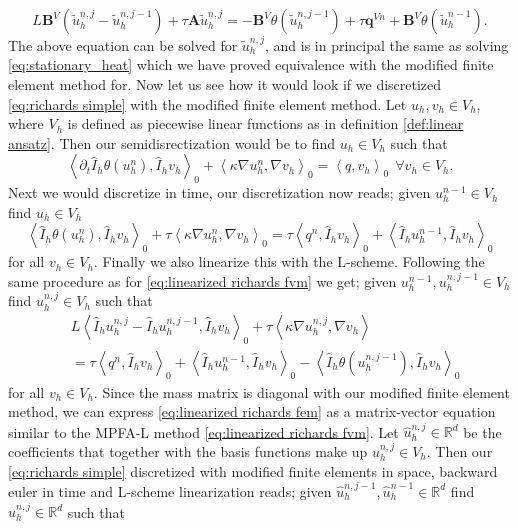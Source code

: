 \documentclass[../Main/main.tex]{subfiles}
\begin{document}
	\begin{equation}\label{eq:linearized richards fvm}
		L\pmb{B}^V(\tilde{u}^{n,j}_h-\tilde{u}^{n,j-1}_h) + \tau \pmb{A} \tilde{u}_h^{n,j} = -\pmb{B}^V \theta (\tilde{u}_h^{n,j-1})  + \tau \pmb{q}^{Vn} +  \pmb{B}^V \theta (\tilde{u}_h^{n-1}).
	\end{equation}
	The above equation can be solved for $\tilde{u}_h^{n,j}$, and is in principal the same as solving \eqref{eq:stationary_heat} which we have proved equivalence with the modified finite element method for.
	Now let us see how it would look if we discretized \eqref{eq:richards simple} with the modified finite element method. Let $u_h, v_h\in V_h$, where $V_h$ is defined as piecewise linear functions as in definition \ref{def:linear ansatz}. Then our semidisrectization would be to find $u_h \in V_h$ such that
	\begin{equation}
		\left \langle \partial_t\hat{I}_h \theta(u_h^n),\hat{I}_h v_h \right \rangle_0 + \left \langle \kappa \nabla u^n_h, \nabla v_h \right \rangle_0 = \left \langle q,v_h \right \rangle_0 \ \ \forall v_h \in V_h.
	\end{equation}
	Next we would discretize in time, our discretization now reads; given $u_h^{n-1} \in V_h$ find $u_h \in V_h$
	\begin{equation}
		\left \langle \hat{I}_h \theta(u_h^n),\hat{I}_h v_h \right \rangle_0 +\tau \left \langle \kappa \nabla u^n_h, \nabla v_h \right \rangle_0 = \tau \left \langle q^n,\hat{I}_h v_h \right \rangle_0 + \left \langle \hat{I}_h u_h^{n-1},\hat{I}_h v_h \right \rangle_0
	\end{equation}
	for all $v_h \in V_h$. Finally we also linearize this with the L-scheme. Following the same procedure as for \eqref{eq:linearized richards fvm} we get; given  $u_h^{n-1},u_h^{n,j-1} \in V_h$ find $u_h^{n,j} \in V_h$ such that
	\begin{equation}\label{eq:linearized richards fem}
		\begin{aligned}
			&L \left \langle \hat{I}_h u^{n,j}_h -  \hat{I}_h u^{n,j-1}_h,\hat{I}_h v_h \right \rangle_0 + \tau \left \langle \kappa \nabla u^{n,j}_h,\nabla v_h \right \rangle \\&=\tau \left \langle q^n,\hat{I}_h v_h \right \rangle_0 + \left \langle \hat{I}_h u_h^{n-1},\hat{I}_h v_h \right \rangle_0 -\left \langle \hat{I}_h \theta(u^{n,j-1}_h),\hat{I}_h v_h \right \rangle_0
		\end{aligned}
	\end{equation}
	for all $v_h \in V_h$. Since the mass matrix is diagonal with our modified finite element method, we can express \eqref{eq:linearized richards fem} as a matrix-vector equation similar to the MPFA-L method \eqref{eq:linearized richards fvm}. Let $\hat{u}_h^{n,j} \in \mathbb{R}^d$ be the coefficients that together with the basis functions make up $u_h^{n,j} \in V_h$. Then our \eqref{eq:richards simple} discretized with modified finite elements in space, backward euler in time and L-scheme linearization reads; given $\hat{u}_h^{n,j-1},\hat{u}_h^{n-1} \in \mathbb{R}^d$ find  $\hat{u}_h^{n,j} \in \mathbb{R}^d$ such that 
\end{document}

